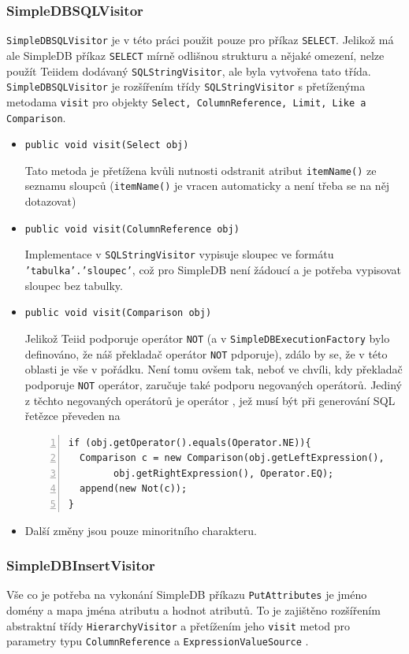 \documentclass[oneside,12pt,final]{fithesis2}
\begin{document}
\subsubsection{SimpleDBSQLVisitor}
\texttt{SimpleDBSQLVisitor} je v této práci použit pouze pro příkaz \texttt{SELECT}. Jelikož má ale SimpleDB příkaz \texttt{SELECT} mírně odlišnou strukturu a nějaké omezení, nelze použít Teiidem dodávaný \texttt{SQLStringVisitor}, ale byla vytvořena tato třída.
\texttt{SimpleDBSQLVisitor} je rozšířením třídy \texttt{SQLStringVisitor} s přetíženýma metodama \texttt{visit} pro objekty \texttt{Select, ColumnReference, Limit, Like a Comparison}.
\begin{itemize}
 \item \texttt{public void visit(Select obj)}
 
 Tato metoda je přetížena kvůli nutnosti odstranit atribut \texttt{itemName()} ze seznamu sloupců (\texttt{itemName()} je vracen automaticky a není třeba se na něj dotazovat)
 \item \texttt{public void visit(ColumnReference obj)}
 
 Implementace v \texttt{SQLStringVisitor} vypisuje sloupec ve formátu \texttt{'tabulka'\allowbreak.'sloupec'}, což pro SimpleDB není žádoucí a je potřeba vypisovat sloupec bez tabulky.
 
 \item \texttt{public void visit(Comparison obj)}
 
 Jelikož Teiid podporuje operátor \texttt{NOT} (a v \texttt{SimpleDBExecutionFactory} bylo definováno, že náš překladač operátor \texttt{NOT} pdporuje), zdálo by se, že v této oblasti je vše v pořádku. Není tomu ovšem tak, neboť ve chvíli, kdy překladač podporuje \texttt{NOT} operátor, zaručuje také podporu negovaných operátorů. Jediný z těchto negovaných operátorů je operátor , jež musí být při generování SQL řetězce převeden na 
 \begin{Verbatim}[fontsize=\small,numbers=left]
if (obj.getOperator().equals(Operator.NE)){
  Comparison c = new Comparison(obj.getLeftExpression(), 
		obj.getRightExpression(), Operator.EQ);
  append(new Not(c));
}
 \end{Verbatim}
\item Další změny jsou pouze minoritního charakteru.
\end{itemize}

\subsubsection{SimpleDBInsertVisitor}
Vše co je potřeba na vykonání SimpleDB příkazu \texttt{PutAttributes} je jméno domény a mapa jména atributu a hodnot atributů. To je zajištěno rozšířením abstraktní třídy \texttt{HierarchyVisitor} a přetížením jeho \texttt{visit} metod pro parametry typu \texttt{ColumnReference} a \texttt{ExpressionValueSource}	.
\end{document}
